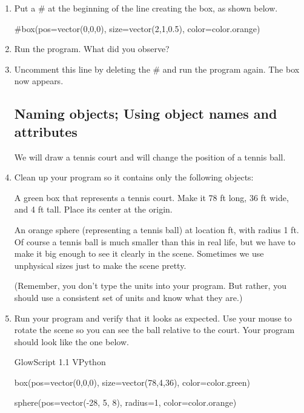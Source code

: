 \begin{enumerate}
	\item Put a \# at the beginning of the line creating the box, as shown below.

\begin{myvpython}
#box(pos=vector(0,0,0), size=vector(2,1,0.5), color=color.orange)
\end{myvpython}

	\item Run the program. What did you observe?
	
	\item Uncomment this line by deleting the \# and run the program again. The box now appears.
	
	\subsection*{Naming objects; Using object names and attributes}
	
We will draw a tennis court and will change the position of a tennis ball.

	\item Clean up your program so it contains only the following objects:  

A green box that represents a tennis court. Make it 78 ft long, 36 ft wide, and 4 ft tall. Place its center at the origin.

An orange sphere (representing a tennis ball) at location  ft, with radius 1 ft. Of course a tennis ball is much smaller than this in real life, but we have to make it big enough to see it clearly in the scene. Sometimes we use unphysical sizes just to make the scene pretty.

(Remember, you don't type the units into your program. But rather, you should use a consistent set of units and know what they are.)

	\item Run your program and verify that it looks as expected. Use your mouse to rotate the scene so you can see the ball relative to the court. Your program should look like the one below.
	
\begin{vpythonprogram}
GlowScript 1.1 VPython

box(pos=vector(0,0,0), size=vector(78,4,36), color=color.green)

sphere(pos=vector(-28, 5, 8), radius=1, color=color.orange)

\end{vpythonprogram}
	

\end{enumerate}
